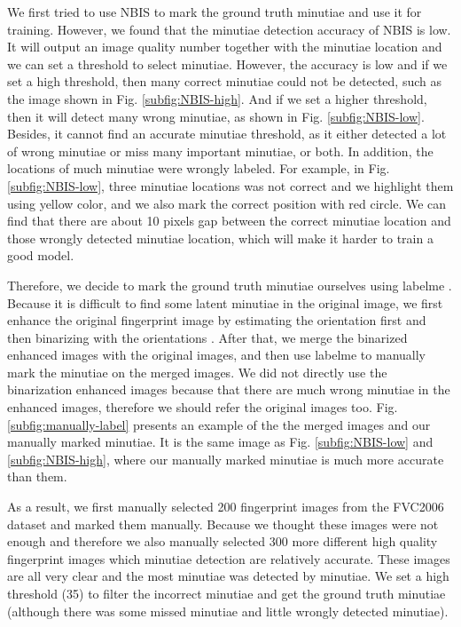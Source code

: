 We first tried to use NBIS \cite{NBIS} to mark the ground truth minutiae and use it for training.
However, we found that the minutiae detection accuracy of NBIS is low.
It will output an image quality number together with the minutiae location and we can set a threshold to select minutiae.
However, the accuracy is low and if we set a high threshold, then many correct minutiae could not be detected, such as the image shown in Fig. \ref{subfig:NBIS-high}.
And if we set a higher threshold, then it will detect many wrong minutiae, as shown in Fig. \ref{subfig:NBIS-low}.
Besides, it cannot find an accurate minutiae threshold, as it either detected a lot of wrong minutiae or miss many important minutiae, or both.
In addition, the locations of much minutiae were wrongly labeled.
For example, in Fig. \ref{subfig:NBIS-low}, three minutiae locations was not correct and we highlight them using yellow color, and we also mark the correct position with red circle.
We can find that there are about 10 pixels gap between the correct minutiae location and those wrongly detected minutiae location, which will make it harder to train a good model.

Therefore, we decide to mark the ground truth minutiae ourselves using labelme \cite{labelme}.
Because it is difficult to find some latent minutiae in the original image, we first enhance the original fingerprint image by estimating the orientation first and then binarizing with the orientations \cite{caoFingerprintImageEnhancement2017}.
After that, we merge the binarized enhanced images with the original images, and then use labelme to manually mark the minutiae on the merged images.
We did not directly use the binarization enhanced images because that there are much wrong minutiae in the enhanced images, therefore we should refer the original images too.
Fig. \ref{subfig:manually-label} presents an example of the the merged images and our manually marked minutiae.
It is the same image as Fig. \ref{subfig:NBIS-low} and \ref{subfig:NBIS-high}, where our manually marked minutiae is much more accurate than them.

As a result, we first manually selected 200 fingerprint images from the FVC2006 dataset \cite{FVC2006} and marked them manually.
Because we thought these images were not enough and therefore we also manually selected 300 more different high quality fingerprint images which minutiae detection are relatively accurate.
These images are all very clear and the most minutiae was detected by minutiae.
We set a high threshold (35) to filter the incorrect minutiae and get the ground truth minutiae (although there was some missed minutiae and little wrongly detected minutiae).

